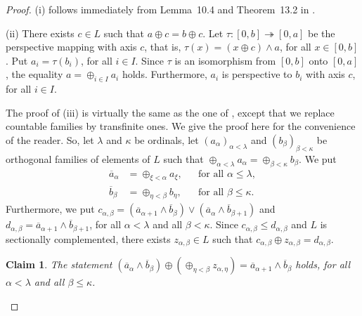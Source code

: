 \documentclass[psamsfonts,reqno]{memo-l}
\theoremstyle{plain}
\newtheorem{claim}{Claim}
\theoremstyle{definition}
\theoremstyle{remark}
\numberwithin{equation}{section}
\newcommand{\oll}[1]{\overline{#1}}
\newcommand{\famm}[2]{(#1)_{#2}}
\begin{document}
\begin{proof}
(i) follows immediately from Lemma~10.4 and Theorem~13.2
in \cite{WDim}.

(ii) There exists $c\in L$ such that $a\oplus c=b\oplus c$.
Let $\tau\colon[0,b]\twoheadrightarrow[0,a]$ be the perspective mapping
with axis $c$, that is, $\tau(x)=(x\oplus c)\wedge a$, for all $x\in[0,b]$.
Put $a_i=\tau(b_i)$, for all $i\in I$. Since $\tau$ is an isomorphism from
$[0,b]$ onto $[0,a]$, the equality $a=\oplus_{i\in I}a_i$ holds. Furthermore,
$a_i$ is perspective to $b_i$
with axis $c$, for all $i\in I$.

The proof of (iii) is virtually the same as the one of
\cite[Lemma~12.17]{WDim}, except that we replace countable families by
transfinite ones. We give the proof here for the convenience of the reader.
So, let $\lambda$ and $\kappa$ be ordinals, let
$\famm{a_\alpha}{\alpha<\lambda}$ and
$\famm{b_\beta}{\beta<\kappa}$ be orthogonal families of elements of $L$
such that $\oplus_{\alpha<\lambda}a_\alpha=\oplus_{\beta<\kappa}b_\beta$. We
put
   \begin{align*}
   \oll{a}_\alpha&=
   \oplus_{\xi<\alpha}a_\xi,&&\text{for all }\alpha\leq\lambda,\\
   \oll{b}_\beta&=\oplus_{\eta<\beta}b_\eta,&&\text{for all }\beta\leq\kappa.
   \end{align*}
Furthermore, we put $c_{\alpha,\beta}=
(\oll{a}_{\alpha+1}\wedge\oll{b}_{\beta})\vee
(\oll{a}_{\alpha}\wedge\oll{b}_{\beta+1})$ and
$d_{\alpha,\beta}=\oll{a}_{\alpha+1}\wedge\oll{b}_{\beta+1}$, for all
$\alpha<\lambda$ and all $\beta<\kappa$. Since
$c_{\alpha,\beta}\leq d_{\alpha,\beta}$ and $L$ is sectionally complemented,
there exists $z_{\alpha,\beta}\in L$ such that
$c_{\alpha,\beta}\oplus z_{\alpha,\beta}=d_{\alpha,\beta}$.

\setcounter{claim}{0}
\begin{claim}\label{Cl:IneqMC1}
The statement
$(\oll{a}_\alpha\wedge\oll{b}_\beta)\oplus(\oplus_{\eta<\beta}z_{\alpha,\eta})
=\oll{a}_{\alpha+1}\wedge\oll{b}_\beta$ holds, for all $\alpha<\lambda$
and all $\beta\leq\kappa$.
\end{claim}


\end{proof}
\end{document}
